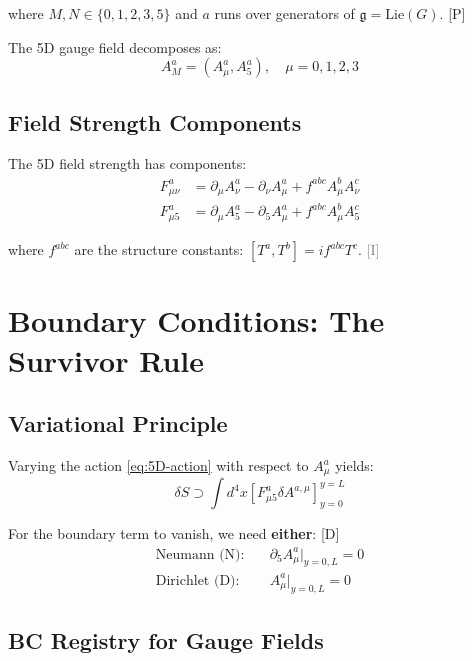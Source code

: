 \documentclass[11pt,a4paper]{article}
\newcommand{\tagD}{\textcolor{blue!70!black}{[D]}}
\newcommand{\tagP}{\textcolor{green!50!black}{[P]}}
\newcommand{\tagI}{\textcolor{gray}{[I]}}
\begin{document}
where $M, N \in \{0,1,2,3,5\}$ and $a$ runs over generators of $\mathfrak{g} = \text{Lie}(G)$. \tagP

The 5D gauge field decomposes as:
\begin{equation}
\label{eq:AM-decomp}
A_M^a = (A_\mu^a, A_5^a), \quad \mu = 0,1,2,3
\end{equation}

\subsection{Field Strength Components}

The 5D field strength has components:
\begin{align}
\label{eq:Fmunu}
F_{\mu\nu}^a &= \partial_\mu A_\nu^a - \partial_\nu A_\mu^a + f^{abc} A_\mu^b A_\nu^c \\
\label{eq:Fmu5}
F_{\mu 5}^a &= \partial_\mu A_5^a - \partial_5 A_\mu^a + f^{abc} A_\mu^b A_5^c
\end{align}

where $f^{abc}$ are the structure constants: $[T^a, T^b] = i f^{abc} T^c$. \tagI

\section{Boundary Conditions: The Survivor Rule}

\subsection{Variational Principle}

Varying the action \eqref{eq:5D-action} with respect to $A_\mu^a$ yields:
\begin{equation}
\label{eq:variation}
\delta S \supset \int d^4x \left[ F^{a}_{\mu 5} \delta A^{a,\mu} \right]_{y=0}^{y=L}
\end{equation}

For the boundary term to vanish, we need \textbf{either}: \tagD
\begin{align}
\label{eq:neumann-bc}
\text{Neumann (N):} \quad & \partial_5 A_\mu^a \big|_{y=0,L} = 0 \\
\label{eq:dirichlet-bc}
\text{Dirichlet (D):} \quad & A_\mu^a \big|_{y=0,L} = 0
\end{align}

\subsection{BC Registry for Gauge Fields}
\end{document}
